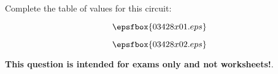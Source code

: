 

Complete the table of values for this circuit:

$$\epsfbox{03428x01.eps}$$







$$\epsfbox{03428x02.eps}$$







{\bf This question is intended for exams only and not worksheets!}.



